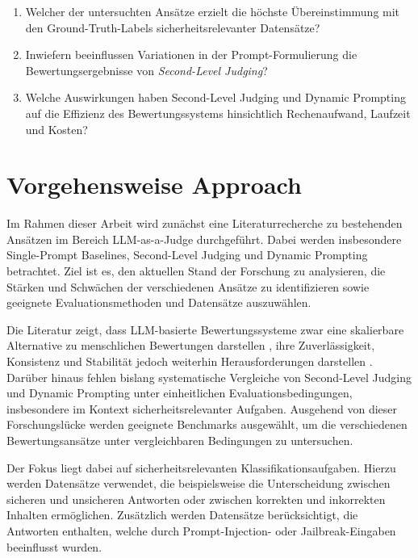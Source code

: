 \documentclass[ngerman]{rwureport}
\begin{document}
{{{{{\begin{enumerate}
		\item Welcher der untersuchten Ansätze erzielt die höchste Übereinstimmung mit den Ground-Truth-Labels sicherheitsrelevanter Datensätze?
		
		
		\item Inwiefern beeinflussen Variationen in der Prompt-Formulierung die Bewertungsergebnisse von \textit{Second-Level Judging}?
		
		\item Welche Auswirkungen haben Second-Level Judging und Dynamic Prompting auf die Effizienz des Bewertungssystems hinsichtlich Rechenaufwand, Laufzeit und Kosten?
	\end{enumerate}	
    
}


\section{
    {Vorgehensweise}
    {Approach}}
\label{sec:approach}

{
		
		Im Rahmen dieser Arbeit wird zunächst eine Literaturrecherche zu bestehenden Ansätzen im Bereich LLM-as-a-Judge durchgeführt. Dabei werden insbesondere Single-Prompt Baselines, Second-Level Judging und Dynamic Prompting betrachtet. Ziel ist es, den aktuellen Stand der Forschung zu analysieren, die Stärken und Schwächen der verschiedenen Ansätze zu identifizieren sowie geeignete Evaluationsmethoden und Datensätze auszuwählen.
		
		Die Literatur zeigt, dass LLM-basierte Bewertungssysteme zwar eine skalierbare Alternative zu menschlichen Bewertungen darstellen \cite{zheng2023judging}, ihre Zuverlässigkeit, Konsistenz und Stabilität jedoch weiterhin Herausforderungen darstellen \cite{gu2026surveyjudge, biskupski2026evaluating,thakur2025judging}. Darüber hinaus fehlen bislang systematische Vergleiche von Second-Level Judging und Dynamic Prompting unter einheitlichen Evaluationsbedingungen, insbesondere im Kontext sicherheitsrelevanter Aufgaben. Ausgehend von dieser Forschungslücke werden geeignete Benchmarks ausgewählt, um die verschiedenen Bewertungsansätze unter vergleichbaren Bedingungen zu untersuchen.
		
		Der Fokus liegt dabei auf sicherheitsrelevanten Klassifikationsaufgaben. Hierzu werden Datensätze verwendet, die beispielsweise die Unterscheidung zwischen sicheren und unsicheren Antworten oder zwischen korrekten und inkorrekten Inhalten ermöglichen. Zusätzlich werden Datensätze berücksichtigt, die Antworten enthalten, welche durch Prompt-Injection- oder Jailbreak-Eingaben beeinflusst wurden.
		
}}}}}
\end{document}
